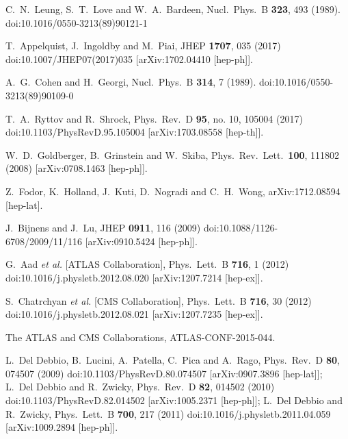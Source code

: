 \documentclass[a4paper,11pt]{article}
\begin{document}
\begin{thebibliography}{99}
C.~N.~Leung, S.~T.~Love and W.~A.~Bardeen,
Nucl.\ Phys.\ B {\bf 323}, 493 (1989).
doi:10.1016/0550-3213(89)90121-1


T.~Appelquist, J.~Ingoldby and M.~Piai,
JHEP {\bf 1707}, 035 (2017)
doi:10.1007/JHEP07(2017)035
[arXiv:1702.04410 [hep-ph]].


A.~G.~Cohen and H.~Georgi,
Nucl.\ Phys.\ B {\bf 314}, 7 (1989).
doi:10.1016/0550-3213(89)90109-0


T.~A.~Ryttov and R.~Shrock,
Phys.\ Rev.\ D {\bf 95}, no. 10, 105004 (2017)
doi:10.1103/PhysRevD.95.105004
[arXiv:1703.08558 [hep-th]].


  
W.~D.~Goldberger, B.~Grinstein and W.~Skiba,
Phys.\ Rev.\ Lett.\  {\bf 100}, 111802 (2008)
[arXiv:0708.1463 [hep-ph]].

Z.~Fodor, K.~Holland, J.~Kuti, D.~Nogradi and C.~H.~Wong,
arXiv:1712.08594 [hep-lat].
  
J.~Bijnens and J.~Lu,
JHEP {\bf 0911}, 116 (2009)
doi:10.1088/1126-6708/2009/11/116
[arXiv:0910.5424 [hep-ph]].
  

G.~Aad {\it et al.} [ATLAS Collaboration],
Phys.\ Lett.\ B {\bf 716}, 1 (2012)
doi:10.1016/j.physletb.2012.08.020
[arXiv:1207.7214 [hep-ex]].


S.~Chatrchyan {\it et al.} [CMS Collaboration],
Phys.\ Lett.\ B {\bf 716}, 30 (2012)
doi:10.1016/j.physletb.2012.08.021
[arXiv:1207.7235 [hep-ex]].


The ATLAS and CMS Collaborations,
ATLAS-CONF-2015-044.

L.~Del Debbio, B.~Lucini, A.~Patella, C.~Pica and A.~Rago,
Phys.\ Rev.\ D {\bf 80}, 074507 (2009)
doi:10.1103/PhysRevD.80.074507
[arXiv:0907.3896 [hep-lat]];
L.~Del Debbio and R.~Zwicky,
Phys.\ Rev.\ D {\bf 82}, 014502 (2010)
doi:10.1103/PhysRevD.82.014502
[arXiv:1005.2371 [hep-ph]];
L.~Del Debbio and R.~Zwicky,
Phys.\ Lett.\ B {\bf 700}, 217 (2011)
doi:10.1016/j.physletb.2011.04.059
[arXiv:1009.2894 [hep-ph]].


\end{thebibliography}
\end{document}
